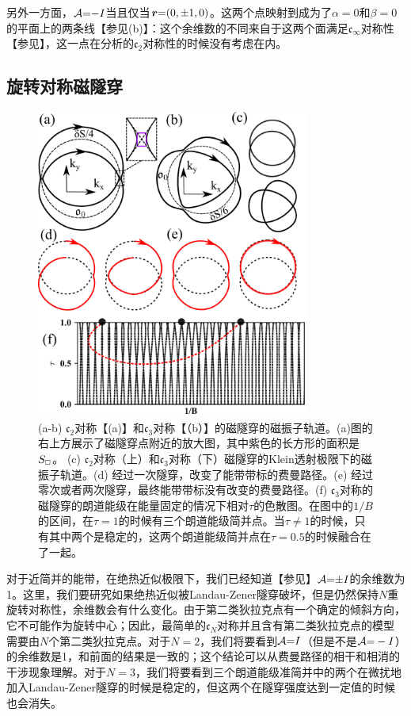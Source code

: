 另外一方面，${\cal A}{=}{-}I$当且仅当$\boldsymbol{r}{=}(0,{\pm} 1,0)$。这两个点映射到成为了$\alpha{=}0$和$\beta{=}0$的平面上的两条线【参见(b)】：这个余维数的不同来自于这两个面满足$\mathfrak{c}_{\infty}$对称性【参见】，这一点在分析的$\mathfrak{c}_2$对称性的时候没有考虑在内。

\subsection{旋转对称磁隧穿}\label{sec:rotsymmbreakdown}

\begin{figure}
\includegraphics[width=0.8\textwidth]{../figures/Cn-breakdown.png}
\centering
\caption{(a-b) $\mathfrak{c}_2$对称【(a)】和$\mathfrak{c}_3$对称【（b）】的磁隧穿的磁振子轨道。(a)图的右上方展示了磁隧穿点附近的放大图，其中紫色的长方形的面积是$S_{\scriptscriptstyle{\square}}$。 (c) $\mathfrak{c}_2$对称（上）和$\mathfrak{c}_3$对称（下）磁隧穿的Klein透射极限下的磁振子轨道。(d) 经过一次隧穿，改变了能带带标的费曼路径。(e) 经过零次或者两次隧穿，最终能带带标没有改变的费曼路径。(f) $\mathfrak{c}_3$对称的磁隧穿的朗道能级在能量固定的情况下相对$\tau$的色散图。在图中的$1/B$的区间，在$\tau=1$的时候有三个朗道能级简并点。当$\tau\ne 1$的时候，只有其中两个是稳定的，这两个朗道能级简并点在$\tau=0.5$的时候融合在了一起。\label{fig:Cn-breakdown}}
\end{figure}

对于近简并的能带，在绝热近似极限下，我们已经知道【参见】${\cal A}{=}{\pm} I$的余维数为1。这里，我们要研究如果绝热近似被Landau-Zener隧穿破坏，但是仍然保持$N$重旋转对称性，余维数会有什么变化。由于第二类狄拉克点有一个确定的倾斜方向，它不可能作为旋转中心；因此，最简单的$\mathfrak{c}_N$对称并且含有第二类狄拉克点的模型需要由$N$个第二类狄拉克点。对于$N=2$，我们将要看到${\cal A}{=}I$（但是不是${\cal A}{=}-I$）的余维数是1，和前面的结果是一致的；这个结论可以从费曼路径的相干和相消的干涉现象理解。对于$N=3$，我们将要看到三个朗道能级准简并中的两个在微扰地加入Landau-Zener隧穿的时候是稳定的，但这两个在隧穿强度达到一定值的时候也会消失。


